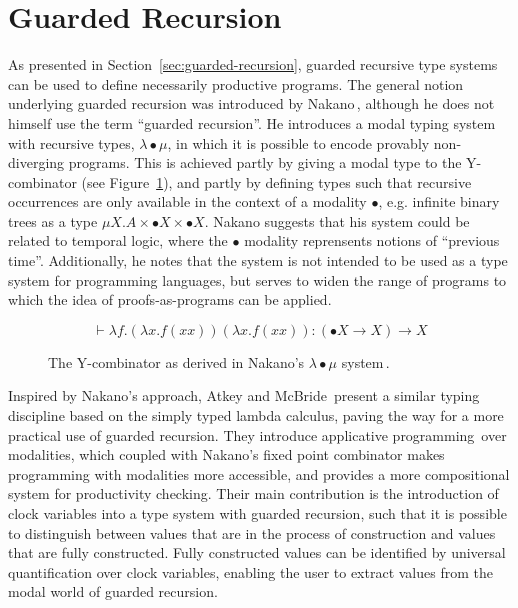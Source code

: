 \section{Guarded Recursion}

As presented in Section~\ref{sec:guarded-recursion}, guarded recursive type systems can be used to define necessarily productive programs. The general notion underlying guarded recursion was introduced by Nakano\,\citep{Nakano:2000}, although he does not himself use the term ``guarded recursion''. He introduces a modal typing system with recursive types, $\lambda\!\bullet\!\mu$, in which it is possible to encode provably non-diverging programs. This is achieved partly by giving a modal type to the Y-combinator (see Figure~\ref{fig:nakano_Y}), and partly by defining types such that recursive occurrences are only available in the context of a modality $\bullet$, e.g. infinite binary trees as a type $\mu X.A\times\bullet X\times\bullet X$. Nakano suggests that his system could be related to temporal logic, where the $\bullet$ modality reprensents notions of ``previous time''. Additionally, he notes that the system is not intended to be used as a type system for programming languages, but serves to widen the range of programs to which the idea of proofs-as-programs can be applied.

\begin{figure}
\[
\vdash \lambda f. (\lambda x. f (x x)) (\lambda x. f (x x)) : (\bullet X \to X) \to X
\]
\caption{The Y-combinator as derived in Nakano's $\lambda\!\bullet\!\mu$ system\,\citep{Nakano:2000}.}
\label{fig:nakano_Y}
\end{figure}

Inspired by Nakano's approach, Atkey and McBride\,\citep{Atkey:2013} present a similar typing discipline based on the simply typed lambda calculus, paving the way for a more practical use of guarded recursion. They introduce applicative programming\,\citep{Mcbride:2008} over modalities, which coupled with Nakano's fixed point combinator makes programming with modalities more accessible, and provides a more compositional system for productivity checking. Their main contribution is the introduction of clock variables into a type system with guarded recursion, such that it is possible to distinguish between values that are in the process of construction and values that are fully constructed. Fully constructed values can be identified by universal quantification over clock variables, enabling the user to extract values from the modal world of guarded recursion.

